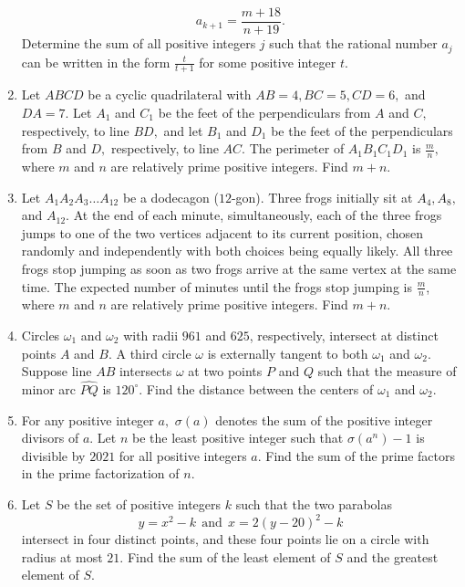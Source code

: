 \documentclass{article}
\begin{document}
\begin{enumerate}[label=\arabic*., itemsep=0.5em]
\begin{equation*}
a_{k+1} = \frac{m + 18}{n+19}.
\end{equation*}
Determine the sum of all positive integers \(j\) such that the rational number \(a_j\) can be written in the form \(\frac{t}{t+1}\) for some positive integer \(t\).\par \vspace{0.5em}\item Let \(ABCD\) be a cyclic quadrilateral with \(AB=4,BC=5,CD=6,\) and \(DA=7.\) Let \(A_1\) and \(C_1\) be the feet of the perpendiculars from \(A\) and \(C,\) respectively, to line \(BD,\) and let \(B_1\) and \(D_1\) be the feet of the perpendiculars from \(B\) and \(D,\) respectively, to line \(AC.\) The perimeter of \(A_1B_1C_1D_1\) is \(\frac mn,\) where \(m\) and \(n\) are relatively prime positive integers. Find \(m+n.\)\par \vspace{0.5em}\item Let \(A_1A_2A_3\ldots A_{12}\) be a dodecagon (\(12\)-gon). Three frogs initially sit at \(A_4,A_8,\) and \(A_{12}\). At the end of each minute, simultaneously, each of the three frogs jumps to one of the two vertices adjacent to its current position, chosen randomly and independently with both choices being equally likely. All three frogs stop jumping as soon as two frogs arrive at the same vertex at the same time. The expected number of minutes until the frogs stop jumping is \(\frac mn\), where \(m\) and \(n\) are relatively prime positive integers. Find \(m+n\).\par \vspace{0.5em}\item Circles \(\omega_1\) and \(\omega_2\) with radii \(961\) and \(625\), respectively, intersect at distinct points \(A\) and \(B\). A third circle \(\omega\) is externally tangent to both \(\omega_1\) and \(\omega_2\). Suppose line \(AB\) intersects \(\omega\) at two points \(P\) and \(Q\) such that the measure of minor arc \(\widehat{PQ}\) is \(120^{\circ}\). Find the distance between the centers of \(\omega_1\) and \(\omega_2\).\par \vspace{0.5em}\item For any positive integer \(a,\) \(\sigma(a)\) denotes the sum of the positive integer divisors of \(a\). Let \(n\) be the least positive integer such that \(\sigma(a^n)-1\) is divisible by \(2021\) for all positive integers \(a\). Find the sum of the prime factors in the prime factorization of \(n\).\par \vspace{0.5em}\item Let \(S\) be the set of positive integers \(k\) such that the two parabolas
\begin{equation*}
y=x^2-k~~\text{and}~~x=2(y-20)^2-k
\end{equation*}
intersect in four distinct points, and these four points lie on a circle with radius at most \(21\). Find the sum of the least element of \(S\) and the greatest element of \(S\).\par \vspace{0.5em}
\end{enumerate}
\end{document}
